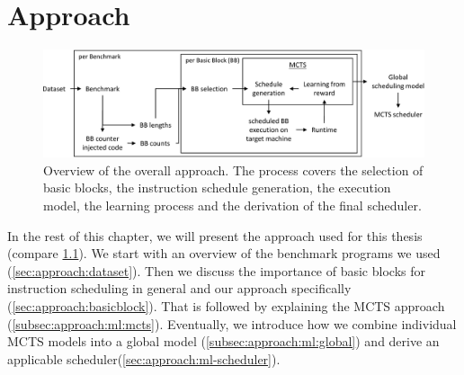 \chapter{Approach}

\begin{figure}
    \centering
    \includegraphics[width=\textwidth]{img/ppt/approach_overview-crop.pdf}
    \caption[Overview of the approach]{Overview of the overall approach. 
    The process covers the selection of basic blocks, the instruction schedule generation, the execution model, the learning process and the derivation of the final scheduler.}
    \label{fig:approach:overview}
\end{figure}
In the rest of this chapter, we will present the approach used for this thesis (compare \cref{fig:approach:overview}).
We start with an overview of the benchmark programs we used (\cref{sec:approach:dataset}).
Then we discuss the importance of basic blocks for instruction scheduling in general and our approach specifically (\cref{sec:approach:basicblock}).
That is followed by explaining the MCTS approach (\cref{subsec:approach:ml:mcts}).
Eventually, we introduce how we combine individual MCTS models into a global model (\cref{subsec:approach:ml:global}) and derive an applicable scheduler(\cref{sec:approach:ml-scheduler}).

